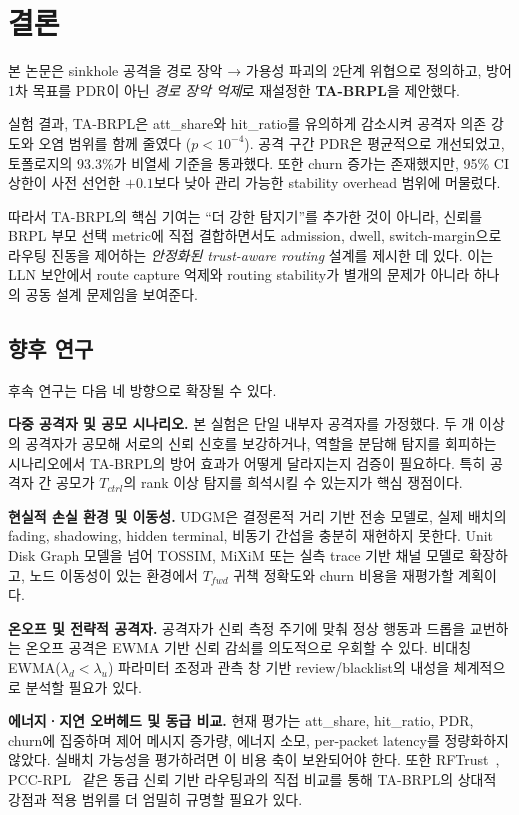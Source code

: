 \documentclass[10pt,a4paper,twocolumn]{article}
\begin{document}
\section{결론}
\label{sec:conclusion}

본 논문은 sinkhole 공격을 경로 장악 → 가용성 파괴의 2단계 위협으로 정의하고,
방어 1차 목표를 PDR이 아닌 \emph{경로 장악 억제}로 재설정한 \textbf{TA-BRPL}을 제안했다.

실험 결과, TA-BRPL은 att\_share와 hit\_ratio를 유의하게 감소시켜
공격자 의존 강도와 오염 범위를 함께 줄였다 ($p<10^{-4}$).
공격 구간 PDR은 평균적으로 개선되었고,
토폴로지의 93.3\%가 비열세 기준을 통과했다.
또한 churn 증가는 존재했지만,
95\% CI 상한이 사전 선언한 $+0.1$보다 낮아
관리 가능한 stability overhead 범위에 머물렀다.

따라서 TA-BRPL의 핵심 기여는 ``더 강한 탐지기''를 추가한 것이 아니라,
신뢰를 BRPL 부모 선택 metric에 직접 결합하면서도
admission, dwell, switch-margin으로 라우팅 진동을 제어하는
\emph{안정화된 trust-aware routing} 설계를 제시한 데 있다.
이는 LLN 보안에서 route capture 억제와 routing stability가
별개의 문제가 아니라 하나의 공동 설계 문제임을 보여준다.

\subsection*{향후 연구}

후속 연구는 다음 네 방향으로 확장될 수 있다.

\textbf{다중 공격자 및 공모 시나리오.}
본 실험은 단일 내부자 공격자를 가정했다.
두 개 이상의 공격자가 공모해 서로의 신뢰 신호를 보강하거나,
역할을 분담해 탐지를 회피하는 시나리오에서
TA-BRPL의 방어 효과가 어떻게 달라지는지 검증이 필요하다.
특히 공격자 간 공모가 $T_{ctrl}$의 rank 이상 탐지를 희석시킬 수 있는지가 핵심 쟁점이다.

\textbf{현실적 손실 환경 및 이동성.}
UDGM은 결정론적 거리 기반 전송 모델로,
실제 배치의 fading, shadowing, hidden terminal, 비동기 간섭을 충분히 재현하지 못한다.
Unit Disk Graph 모델을 넘어 TOSSIM, MiXiM 또는 실측 trace 기반 채널 모델로 확장하고,
노드 이동성이 있는 환경에서 $T_{fwd}$ 귀책 정확도와 churn 비용을 재평가할 계획이다.

\textbf{온오프 및 전략적 공격자.}
공격자가 신뢰 측정 주기에 맞춰 정상 행동과 드롭을 교번하는 온오프 공격은
EWMA 기반 신뢰 감쇠를 의도적으로 우회할 수 있다.
비대칭 EWMA($\lambda_d < \lambda_u$) 파라미터 조정과
관측 창 기반 review/blacklist의 내성을 체계적으로 분석할 필요가 있다.

\textbf{에너지·지연 오버헤드 및 동급 비교.}
현재 평가는 att\_share, hit\_ratio, PDR, churn에 집중하며
제어 메시지 증가량, 에너지 소모, per-packet latency를 정량화하지 않았다.
실배치 가능성을 평가하려면 이 비용 축이 보완되어야 한다.
또한 RFTrust~\cite{rftrust2021}, PCC-RPL~\cite{pccrpl2022} 같은
동급 신뢰 기반 라우팅과의 직접 비교를 통해
TA-BRPL의 상대적 강점과 적용 범위를 더 엄밀히 규명할 필요가 있다.



\end{document}
